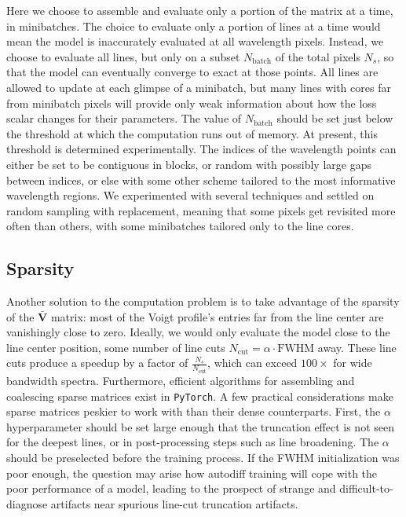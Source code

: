 \documentclass[modern]{aastex631}
\begin{document}
Here we choose to assemble and evaluate only a portion of the matrix at a time, in minibatches. The choice to evaluate only a portion of lines at a time would mean the model is inaccurately evaluated at all wavelength pixels. Instead, we choose to evaluate all lines, but only on a subset $N_{\mathrm{batch}}$ of the total pixels $N_s$, so that the model can eventually converge to exact at those points. All lines are allowed to update at each glimpse of a minibatch, but many lines with cores far from minibatch pixels will provide only weak information about how the loss scalar changes for their parameters. The value of $N_{\mathrm{batch}}$ should be set just below the threshold at which the computation runs out of memory. At present, this threshold is determined experimentally. The indices of the wavelength points can either be set to be contiguous in blocks, or random with possibly large gaps between indices, or else with some other scheme tailored to the most informative wavelength regions. We experimented with several techniques and settled on random sampling with replacement, meaning that some pixels get revisited more often than others, with some minibatches tailored only to the line cores.



\subsection{Sparsity}

Another solution to the computation problem is to take advantage of the sparsity of the $\bm{\bar{V}}$ matrix: most of the Voigt profile's entries far from the line center are vanishingly close to zero. Ideally, we would only evaluate the model close to the line center position, some number of line cuts $N_{\mathrm{cut}}=\alpha \cdot \mathrm{FWHM}$ away. These line cuts produce a speedup by a factor of $\frac{N_s}{N_{\mathrm{cut}}}$, which can exceed $100\times$ for wide bandwidth spectra. Furthermore, efficient algorithms for assembling and coalescing sparse matrices exist in \texttt{PyTorch}. A few practical considerations make sparse matrices peskier to work with than their dense counterparts. First, the $\alpha$ hyperparameter should be set large enough that the truncation effect is not seen for the deepest lines, or in post-processing steps such as line broadening. The $\alpha$ should be preselected before the training process. If the FWHM initialization was poor enough, the question may arise how autodiff training will cope with the poor performance of a model, leading to the prospect of strange and difficult-to-diagnose artifacts near spurious line-cut truncation artifacts.
\end{document}
